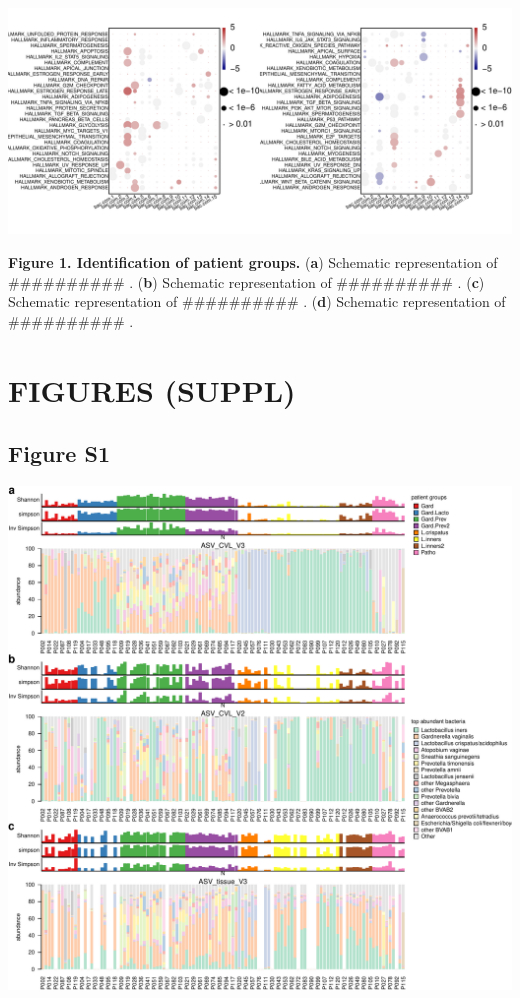 \documentclass[
]{article}
\begin{document}
\includegraphics[width=1\linewidth]{manuscript_template_files/figure-latex/unnamed-chunk-7-4}

\textbf{Figure 1. Identification of patient groups.}
(\textbf{a}) Schematic representation of \#\#\#\#\#\#\#\#\#\# .
(\textbf{b}) Schematic representation of \#\#\#\#\#\#\#\#\#\# .
(\textbf{c}) Schematic representation of \#\#\#\#\#\#\#\#\#\# .
(\textbf{d}) Schematic representation of \#\#\#\#\#\#\#\#\#\# .

\clearpage

\hypertarget{figures-suppl}{%
\section{FIGURES (SUPPL)}\label{figures-suppl}}

\hypertarget{figure-s1}{%
\subsection{Figure S1}\label{figure-s1}}

\includegraphics[width=1\linewidth]{manuscript_template_files/figure-latex/unnamed-chunk-8-1}
\end{document}
